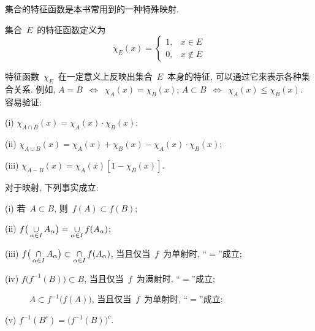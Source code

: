 集合的特征函数是本书常用到的一种特殊映射. 

\begin{definition}
集合~$E$~的特征函数定义为
\[
\chi_E(x) = \left\{\!\!
\begin{array}{ll}
1, & x \in E \\
0, & x \notin E
\end{array}
\right.
\]
\end{definition}

特征函数~$\chi_E$~在一定意义上反映出集合~$E$~本身的特征, 可以通过它来表示各种集合关系. 例如, $A = B$~$\Leftrightarrow$~$\chi_A(x) = \chi_B(x)$; $A \subset B$~$\Leftrightarrow$~$\chi_A(x) \leqslant \chi_B(x)$. 容易验证:

(i) $\chi_{A \cap B}(x) = \chi_A(x) \cdot \chi_B(x)$;

(ii) $\chi_{A \cup B}(x) = \chi_A(x) + \chi_B(x) - \chi_A(x) \cdot \chi_B(x)$;

(iii) $\chi_{A - B}(x) = \chi_A(x) [1 - \chi_B(x)]$.

\begin{proposition}
对于映射, 下列事实成立:

(i) 若~$A \subset B$, 则~$f(A) \subset f(B)$;

(ii) $f\big(\mathop{\cup}\limits_{\alpha \in I} {A_\alpha} \big) = \mathop{\cup}\limits_{\alpha \in I} {f(A_\alpha)}$;

(iii) $f\big(\mathop{\cap}\limits_{\alpha \in I} {A_\alpha} \big) \subset \mathop{\cap}\limits_{\alpha \in I} {f(A_\alpha)}$, 当且仅当~$f$~为单射时, ``$=$''成立;

(iv) $f\big(f^{-1}(B)\big) \subset B$, 当且仅当~$f$~为满射时, ``$=$''成立;

 ~~~~~ $A \subset f^{-1}\big(f(A)\big)$, 当且仅当~$f$~为单射时, ``$=$''成立;

(v) $f^{-1}(B^c) = \big(f^{-1}(B)\big)^c$.
\end{proposition}

